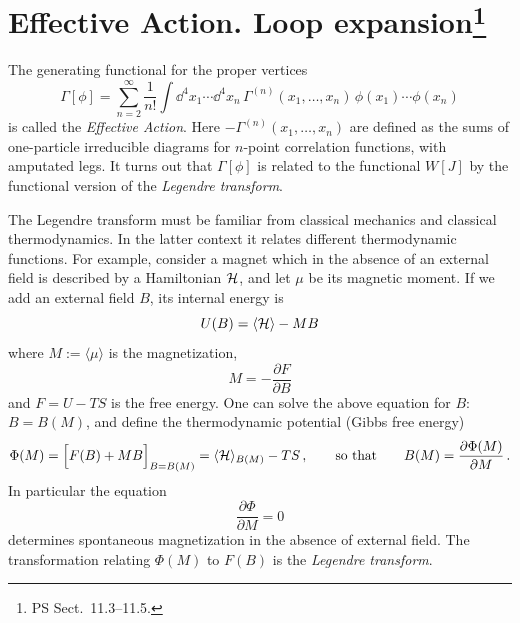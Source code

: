 \section[Effective Action. Loop expansion]{Effective Action. Loop expansion\protect\footnote{PS Sect.~11.3--11.5.}}

The generating functional for the proper vertices
\begin{equation}\label{eq:Gammadef}
\Gamma[\phi]=\sum_{n=2}^\infty\frac1{n!}\int \dd^4x_1\cdots \dd^4x_n\,\Gamma^{(n)}(x_1,\dots,x_n)\,\phi(x_1)\cdots\phi(x_n)
\end{equation}
is called the \emph{Effective Action}. Here $-\Gamma^{(n)}(x_1,\dots,x_n)$ are
defined as the sums of one-particle irreducible diagrams for $n$-point
correlation functions, with amputated legs. It turns out that $\Gamma[\phi]$ is
related to the functional $W[J]$ by the functional version of the
\emph{Legendre transform}.

The Legendre transform must be familiar from classical mechanics and classical
thermodynamics. In the latter context it relates different thermodynamic
functions. For example, consider a magnet which in the absence of an external
field is described by a Hamiltonian $\mathcal{H}$, and let $\mu$ be its magnetic
moment. If we add an external field $B$, its internal energy is
\[
U(B)=\langle\mathcal{H}\rangle-MB
\]
where $M:=\langle\mu\rangle$ is the magnetization,
\[
M=-\frac{\partial F}{\partial B}
\]
and $F=U-TS$ is the free energy. One can solve the above equation for $B$:
$B=B(M)$, and define the thermodynamic potential (Gibbs free energy)
\[
\Phi(M)=\Bigl[F(B)+MB\Bigr]_{B=B(M)}=\langle\mathcal{H}\rangle_{B(M)}-TS\,,
\qquad\text{so that}\qquad
B(M)=\frac{\partial\Phi(M)}{\partial M}\,.
\]
In particular the equation
\[
\frac{\partial\Phi}{\partial M}=0
\]
determines spontaneous magnetization in the absence of external field. The
transformation relating $\Phi(M)$ to $F(B)$ is the \emph{Legendre transform}.

